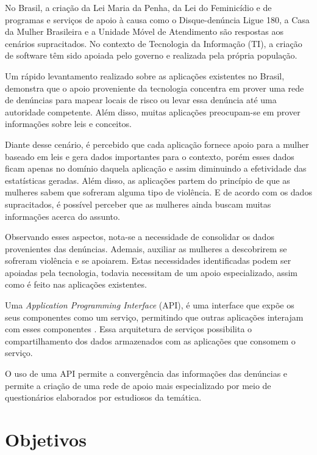 No Brasil, a criação da Lei Maria da Penha, da Lei do Feminicídio e de programas e serviços de apoio à causa 
como o Disque-denúncia Ligue 180, a Casa da Mulher Brasileira e a Unidade Móvel de Atendimento são respostas aos cenários supracitados. No contexto de Tecnologia da Informação (TI), a criação de software têm sido apoiada pelo governo e realizada pela própria população.

Um rápido levantamento realizado sobre as aplicações existentes no Brasil, demonstra que o apoio proveniente da tecnologia concentra em prover uma rede de denúncias para mapear locais de risco ou levar essa denúncia até uma autoridade competente. Além disso, muitas aplicações preocupam-se em prover informações sobre leis e conceitos.

Diante desse cenário, é percebido que cada aplicação fornece apoio para a mulher baseado em leis e gera dados importantes para o contexto, porém esses dados ficam apenas no domínio daquela aplicação e assim diminuindo a efetividade das estatísticas geradas. Além disso, as aplicações partem do princípio de que as mulheres sabem que sofreram alguma tipo de violência. E de acordo com os dados supracitados, é possível perceber que as mulheres ainda buscam muitas informações acerca do assunto.

Observando esses aspectos, nota-se a necessidade de consolidar os dados provenientes das denúncias. Ademais, auxiliar as mulheres a 
descobrirem se sofreram violência e se apoiarem. Estas necessidades identificadas podem ser apoiadas pela tecnologia, todavia necessitam de 
um apoio especializado, assim como é feito nas aplicações existentes.

Uma \textit{Application Programming Interface} (API), é uma interface que expõe os seus componentes como um serviço, permitindo que outras aplicações interajam com esses componentes \cite{wagh2012comparative, understanding_web}. Essa arquitetura de serviços possibilita o compartilhamento dos dados armazenados com as aplicações que consomem o serviço. 

O uso de uma API permite a convergência das informações das denúncias e permite a criação de uma rede de apoio mais especializado por meio de questionários elaborados por estudiosos da temática.


\section{Objetivos}


